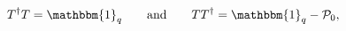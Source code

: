 \begin{equation}
 T^\dagger T=\mathbbm{1}_q\qquad\text{and}\qquad
 TT^\dagger=\mathbbm{1}_q-\mathcal{P}_0,
\end{equation}

